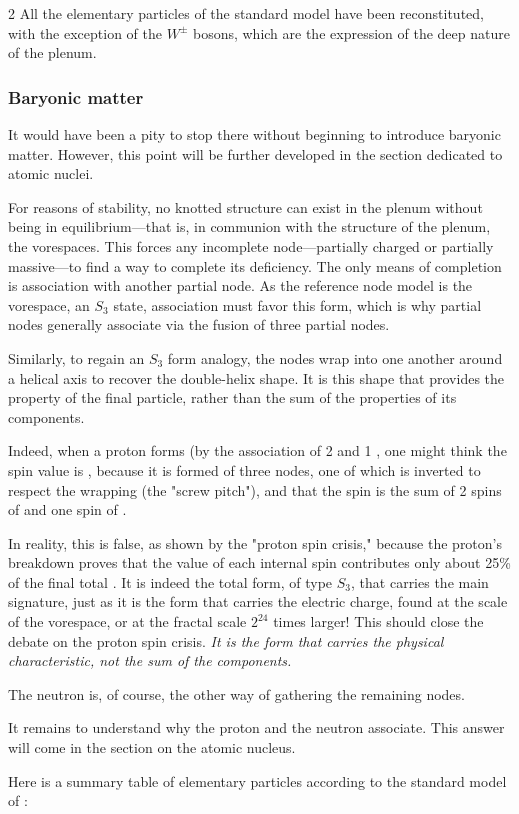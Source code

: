 \begin{multicols}{2}
	All the elementary particles of the standard model have been reconstituted, with the exception of the $W^\pm$ bosons, which are the expression of the deep nature of the plenum.
	
	\subsubsection{Baryonic matter}
	
	It would have been a pity to stop there without beginning to introduce baryonic matter. However, this point will be further developed in the section dedicated to atomic nuclei.
	
	For reasons of stability, no knotted structure can exist in the plenum without being in equilibrium—that is, in communion with the structure of the plenum, the vorespaces. This forces any incomplete node—partially charged or partially massive—to find a way to complete its deficiency. The only means of completion is association with another partial node. As the reference node model is the vorespace, an $S_3$ state, association must favor this form, which is why partial nodes generally associate via the fusion of three partial nodes.
	
	Similarly, to regain an $S_3$ form analogy, the nodes wrap into one another around a helical axis to recover the double-helix shape. It is this shape that provides the property of the final particle, rather than the sum of the properties of its components.
	
	Indeed, when a proton forms (by the association of 2  and 1 , one might think the spin value is , because it is formed of three nodes, one of which is inverted to respect the wrapping (the "screw pitch"), and that the spin is the sum of 2 spins of  and one spin of .
	
	In reality, this is false, as shown by the "proton spin crisis," because the proton's breakdown proves that the value of each internal spin contributes only about 25\% of the final total \cite{ashman1988measurement}. It is indeed the total form, of type $S_3$, that carries the main signature, just as it is the form  that carries the electric charge, found at the scale of the vorespace, or at the fractal scale $2^{24}$ times larger! This should close the debate on the proton spin crisis. \textit{It is the form that carries the physical characteristic, not the sum of the components.}
	
	The neutron is, of course, the other way of gathering the remaining nodes.
	
	It remains to understand why the proton and the neutron associate. This answer will come in the section on the atomic nucleus.
	
	Here is a summary table of elementary particles according to the standard model of \PQ:
	\vfill
	
	\end{multicols}

